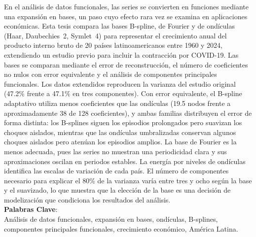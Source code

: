 En el análisis de datos funcionales, las series se convierten en funciones
mediante una expansión en bases, un paso cuyo efecto rara vez se examina en
aplicaciones económicas. Esta tesis compara
las bases B-spline, de Fourier y de ondículas (Haar, Daubechies~2, Symlet~4) para
representar el crecimiento anual del producto interno bruto de 20 países
latinoamericanos entre 1960 y 2024, extendiendo un estudio previo para incluir
la contracción por COVID-19. Las bases se
comparan mediante el error de reconstrucción, el número de coeficientes no nulos
con error equivalente y el análisis de componentes principales funcionales. Los
datos extendidos reproducen la varianza del estudio original (47.2\% frente a
47.1\% en tres componentes). Con error
equivalente, el B-spline adaptativo utiliza menos coeficientes que las ondículas
(19.5 nodos frente a aproximadamente 38 de 128 coeficientes), y ambas familias
distribuyen el error de forma distinta: los B-splines siguen los episodios
prolongados pero suavizan los choques aislados, mientras que las ondículas
umbralizadas conservan algunos choques aislados pero atenúan los episodios
amplios. La base de Fourier es la menos adecuada, pues las series no muestran
una periodicidad clara y sus aproximaciones oscilan en periodos estables. La
energía por niveles de ondículas identifica las escalas de variación de cada
país. El número de componentes necesario para explicar el
80\% de la varianza varía entre tres y ocho según la base y el suavizado, lo que
muestra que la elección de la base es una decisión de modelización que
condiciona los resultados del análisis.\\

\noindent \textbf{Palabras Clave}:\\
Análisis de datos funcionales, expansión en bases, ondículas, B-splines,
componentes principales funcionales, crecimiento económico, América Latina.
